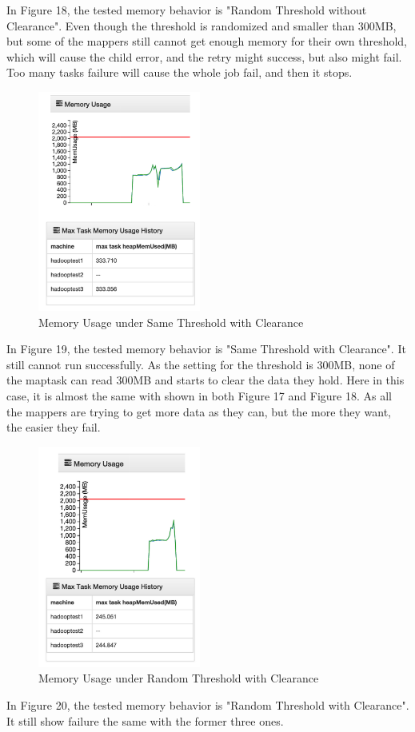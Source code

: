 In Figure 18, the tested memory behavior is "Random Threshold without Clearance". Even though the threshold is randomized and smaller than 300MB, but some of the mappers still cannot get enough memory for their own threshold, which will cause the child error, and the retry might success, but also might fail. Too many tasks failure will cause the whole job fail, and then it stops.

\begin{figure}[ht]
  \centering
    \includegraphics[width=2.1in]{image/test3c.png}
    \caption{Memory Usage under Same Threshold with Clearance}
    \label{ref:test3c}
\end{figure}

In Figure 19, the tested memory behavior is "Same Threshold with Clearance". It still cannot run successfully. As the setting for the threshold is 300MB, none of the maptask can read 300MB and starts to clear the data they hold. Here in this case, it is almost the same with shown in both Figure 17 and Figure 18. As all the mappers are trying to get more data as they can, but the more they want, the easier they fail.

\begin{figure}[h]
  \centering
    \includegraphics[width=2.1in]{image/test3d.png}
    \caption{Memory Usage under Random Threshold with Clearance}
    \label{ref:test3d}
\end{figure}

In Figure 20, the tested memory behavior is "Random Threshold with Clearance". It still show failure the same with the former three ones. 